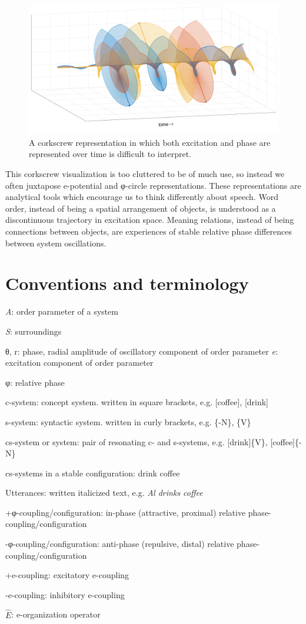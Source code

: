   
\begin{figure}
\includegraphics[width=\textwidth]{figures/Tilsen-img28.png}
\caption{A corkscrew representation in which both excitation and phase are represented over time is difficult to interpret.}
\label{fig:2:21}
\end{figure}
 

  This corkscrew visualization is too cluttered to be of much use, so instead we often juxtapose e-potential and φ{}-circle representations. These representations are analytical tools which encourage us to think differently about speech. Word order, instead of being a spatial arrangement of objects, is understood as a discontinuous trajectory in excitation space. Meaning relations, instead of being connections between objects, are experiences of stable relative phase differences between system oscillations.

\section{Conventions and terminology}

\textit{A}: order parameter of a system

\textit{S}: surroundings

θ, r: phase, radial amplitude of oscillatory component of order parameter
\textit{e}: excitation component of order parameter

φ: relative phase

c-system: concept system. written in square brackets, e.g. [coffee], [drink]

s-system: syntactic system. written in curly brackets, e.g. \{-N\}, \{V\}

cs-system or system: pair of resonating c- and s-systems, e.g. [drink]\{V\}, [coffee]\{-N\}

cs-systems in a stable configuration: {\textbar}drink coffee{\textbar}

Utterances: written italicized text, e.g. \textit{Al drinks coffee}

+φ-coupling/configuration: in-phase (attractive, proximal) relative phase-coupling/configuration

{}-φ-coupling/configuration: anti-phase (repulsive, distal) relative phase-coupling/configuration

+e-coupling: excitatory e-coupling

{}-e-coupling: inhibitory e-coupling

 $\widehat {{E}}$: e-organization operator
